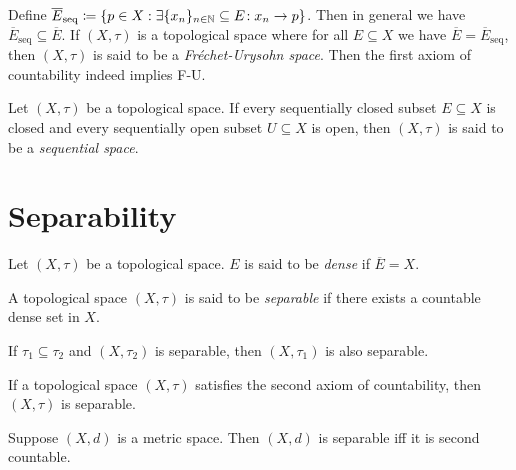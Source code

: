 \documentclass{techreport}
\begin{document}
\begin{remark}\label{Rem:ClosureIsSeqClosureThenFUSpace}
	Define $\overline{E}_{\mathrm{seq}} \coloneqq \{ p \in X : \exists {\{x_n\}_{n \in \mathbb{N}} \subseteq E}\!: x_n \rightarrow p \}$.
	Then in general we have $\overline{E}_{\mathrm{seq}} \subseteq \overline{E}$.
	If $(X,\tau)$ is a topological space where for all $E \subseteq X$ we have $\overline{E} = \overline{E}_{\mathrm{seq}}$, then $(X,\tau)$ is said to be a \emph{Fr{\'e}chet-Urysohn space}.
	Then the first axiom of countability indeed implies F-U.
\end{remark}

\begin{definition}\label{De:SequentialSpace}
	Let $(X,\tau)$ be a topological space.
	If every sequentially closed subset $E \subseteq X$ is closed and every sequentially open subset $U \subseteq X$ is open, then $(X,\tau)$ is said to be a \emph{sequential space}.
\end{definition}
	
\section{Separability}

\begin{definition}\label{De:DenseSet}
	Let $(X,\tau)$ be a topological space.
	$E$ is said to be \emph{dense} if $\overline{E} = X$.
\end{definition}

\begin{definition}\label{De:SeparableSpace}
	A topological space $(X,\tau)$ is said to be \emph{separable} if there exists a countable dense set in $X$.
\end{definition}

\begin{remark}\label{Rem:SubsetSeparable}
	If $\tau_1 \subseteq \tau_2$ and $(X,\tau_2)$ is separable, then $(X,\tau_1)$ is also separable.
\end{remark}

\begin{proposition}\label{Prop:SndAxCountImplySeparable}
	If a topological space $(X,\tau)$ satisfies the second axiom of countability, then $(X,\tau)$ is separable.
\end{proposition}

\begin{proposition}\label{Prop:MetricSeparableImplySndAxCount}
	Suppose $(X,d)$ is a metric space.
	Then $(X,d)$ is separable iff it is second countable.
\end{proposition}
\end{document}

